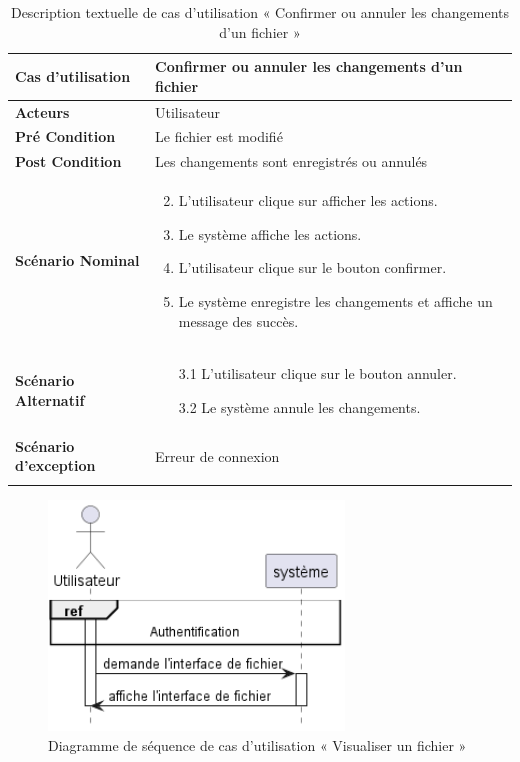 \begin{longtable}{|p{5cm}|p{10cm}|}
\hline
\textbf{Cas d'utilisation}&Confirmer ou annuler les changements d'un fichier\\
\hline
\textbf{Acteurs}&Utilisateur\\
\hline
\textbf{Pré Condition}&Le fichier est modifié\\
\hline
\textbf{Post Condition}&Les changements sont enregistrés ou annulés\\
\hline
\textbf{Scénario Nominal}&
\vspace{-\baselineskip}
\begin{enumerate}
    \setcounter{enumi}{1}
    \item L'utilisateur clique sur afficher les actions.
    \item Le système affiche les actions.
    \item L'utilisateur clique sur le bouton confirmer.
    \item Le système enregistre les changements et affiche un message des succès.
\end{enumerate}\\
\hline
\textbf{Scénario Alternatif}&
\vspace{-\baselineskip}
\begin{enumerate}
    \item [3.1]L'utilisateur clique sur le bouton annuler.
    \item [3.2]Le système annule les changements.
\end{enumerate}\\
\hline
\textbf{Scénario d'exception}&Erreur de connexion\\
\hline
\caption{Description textuelle de cas d'utilisation « Confirmer ou annuler les changements d'un fichier »}
\label{tab:description-textuelle-de-cas-d-utilisation-confirmer-ou-annuler-les-changements-d-un-fichier}
\end{longtable}


\begin{figure}[H]
  \centering
  \includegraphics[width=0.7\textwidth]{out/diagrams/sprint4/view_file/view_file}
  \caption{Diagramme de séquence de cas d'utilisation « Visualiser un fichier   »}
  \label{fig:sequence_view_file}
\end{figure}

